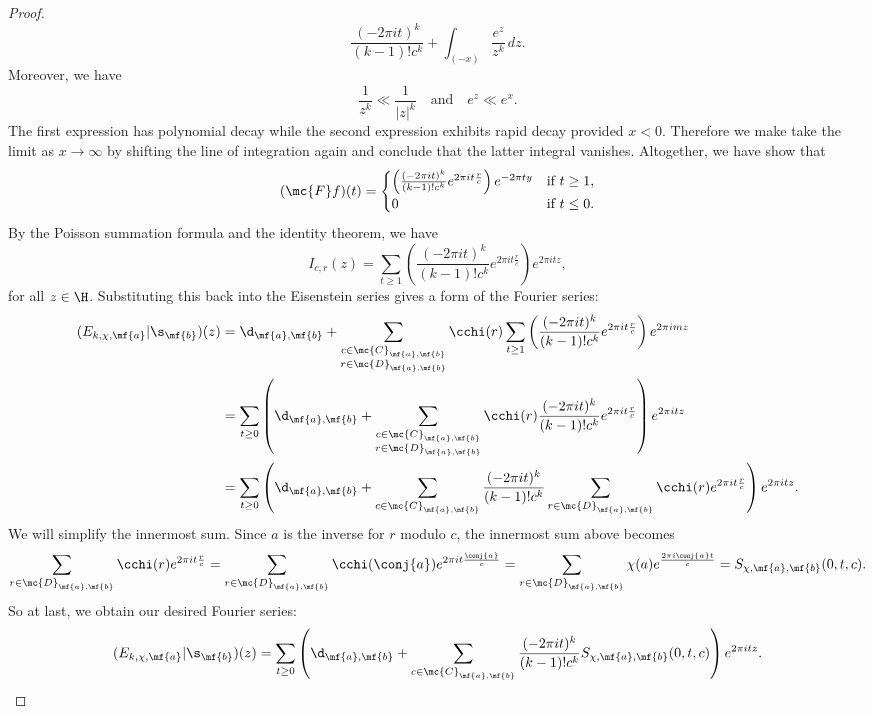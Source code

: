 \begin{proof}
      \[
        \frac{(-2\pi it)^{k}}{(k-1)!c^{k}}+\int_{(-x)}\frac{e^{z}}{z^{k}}\,dz.
      \]
      Moreover, we have
      \[
        \frac{1}{z^{k}} \ll \frac{1}{|z|^{k}} \quad \text{and} \quad e^{z} \ll e^{x}.
      \]
      The first expression has polynomial decay while the second expression exhibits rapid decay provided $x < 0$. Therefore we make take the limit as $x \to \infty$ by shifting the line of integration again and conclude that the latter integral vanishes. Altogether, we have show that
      \[
        (\mc{F}f)(t) = \begin{cases} \left(\frac{(-2\pi it)^{k}}{(k-1)!c^{k}}e^{2\pi it\frac{r}{c}}\right)e^{-2\pi ty} & \text{if $t \ge 1$}, \\ 0 & \text{if $t \le 0$}. \end{cases}
      \]
      By the Poisson summation formula and the identity theorem, we have
      \[
        I_{c,r}(z) = \sum_{t \ge 1}\left(\frac{(-2\pi it)^{k}}{(k-1)!c^{k}}e^{2\pi it\frac{r}{c}}\right)e^{2\pi itz},
      \]
      for all $z \in \H$. Substituting this back into the Eisenstein series gives a form of the Fourier series:
      \begin{align*}
        (E_{k,\chi,\mf{a}}|\s_{\mf{b}})(z) &= \d_{\mf{a},\mf{b}}+\sum_{\substack{c \in \mc{C}_{\mf{a},\mf{b}} \\ r \in \mc{D}_{\mf{a},\mf{b}}}}\cchi(r)\sum_{t \ge 1}\left(\frac{(-2\pi it)^{k}}{(k-1)!c^{k}}e^{2\pi it\frac{r}{c}}\right)e^{2\pi imz} \\
        &= \sum_{t \ge 0}\left(\d_{\mf{a},\mf{b}}+\sum_{\substack{c \in \mc{C}_{\mf{a},\mf{b}} \\ r \in \mc{D}_{\mf{a},\mf{b}}}}\cchi(r)\frac{(-2\pi it)^{k}}{(k-1)!c^{k}}e^{2\pi it\frac{r}{c}}\right)e^{2\pi itz} \\
        &= \sum_{t \ge 0}\left(\d_{\mf{a},\mf{b}}+\sum_{\substack{c \in \mc{C}_{\mf{a},\mf{b}}}}\frac{(-2\pi it)^{k}}{(k-1)!c^{k}}\sum_{r \in \mc{D}_{\mf{a},\mf{b}}}\cchi(r)e^{2\pi it\frac{r}{c}}\right)e^{2\pi itz}.
      \end{align*}
      We will simplify the innermost sum. Since $a$ is the inverse for $r$ modulo $c$, the innermost sum above becomes
      \[
        \sum_{r \in \mc{D}_{\mf{a},\mf{b}}}\cchi(r)e^{2\pi it\frac{r}{c}} = \sum_{r \in \mc{D}_{\mf{a},\mf{b}}}\cchi(\conj{a})e^{2\pi it\frac{\conj{a}}{c}} = \sum_{r \in \mc{D}_{\mf{a},\mf{b}}}\chi(a)e^{\frac{2\pi i\conj{a}t}{c}} = S_{\chi,\mf{a},\mf{b}}(0,t,c).
      \]
      So at last, we obtain our desired Fourier series:
      \[
        (E_{k,\chi,\mf{a}}|\s_{\mf{b}})(z) = \sum_{t \ge 0}\left(\d_{\mf{a},\mf{b}}+\sum_{\substack{c \in \mc{C}_{\mf{a},\mf{b}}}}\frac{(-2\pi it)^{k}}{(k-1)!c^{k}}S_{\chi,\mf{a},\mf{b}}(0,t,c)\right)e^{2\pi itz}.
      \]
    \end{proof}

